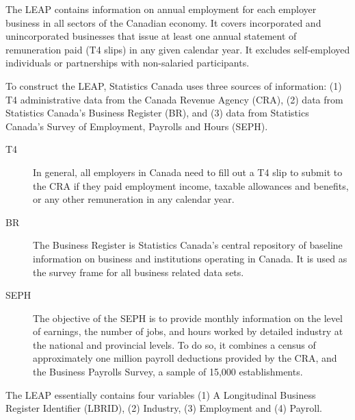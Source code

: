 
The LEAP contains information on annual employment for each employer business in all sectors of the Canadian economy. It covers incorporated and unincorporated businesses that issue at least one annual statement of remuneration paid (T4 slips) in any given calendar year. It excludes self-employed individuals or partnerships with non-salaried participants.

To construct the LEAP, Statistics Canada uses three sources of information: (1) T4 administrative data  from the Canada Revenue Agency (CRA), (2) data from Statistics Canada's Business Register (BR), and (3) data from  Statistics Canada's Survey of Employment, Payrolls and Hours (SEPH). 

\begin{description}
\item[T4] In general, all employers in Canada need to fill out a T4 slip to submit to the CRA if they paid employment income, taxable allowances and benefits, or any other remuneration in any calendar year. 

\item[BR] The Business Register is Statistics Canada's central repository of baseline information on business and institutions operating in Canada. It is used as the survey frame for all business related data sets.

\item[SEPH] The objective of the SEPH is to provide monthly information on the level of earnings, the number of jobs, and hours worked by detailed industry at the national and provincial levels. To do so, it combines a census of approximately one million payroll deductions provided by the CRA, and the Business Payrolls Survey, a sample of 15,000 establishments.  
\end{description}
The LEAP essentially contains four variables (1) A Longitudinal Business Register Identifier (LBRID), (2) Industry, (3) Employment and (4) Payroll. 
